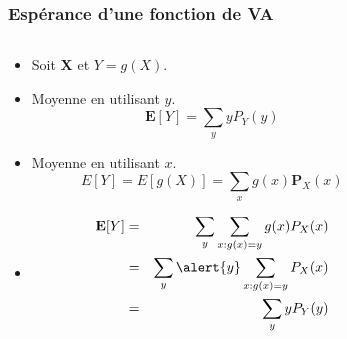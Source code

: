 \documentclass{beamer}
\begin{document}
\begin{frame}[t]
  \frametitle{Espérance d'une fonction de VA}

  \begin{columns}
    \begin{column}{0.5\textwidth}
      \begin{itemize}
        \scriptsize
        \item<1-> Soit \alert{\textbf{X}}  et \alert{$Y = g(X)$}.\\[12pt]
        \item<2->  Moyenne en utilisant $y$.
          $$
          \mathbf{E}[Y] = \sum_y y P_Y(y)
          $$
        \item<3-> Moyenne en utilisant $x$.
          \begin{equation*}
            E[Y] = E[g(X)] = \sum_x g(x) \mathbf{P}_X(x)
          \end{equation*}
        \item<4->
          \begin{eqnarray*}
            \mathbf{E}[Y] &=& \sum_y \sum_{x: g(x)=y}g(x)P_X(x) \\
                          &=& \sum_y \alert{y}\sum_{x: g(x)=y}P_X(x)\\
                          &=& \sum_y y P_Y(y)
          \end{eqnarray*}
      \end{itemize}
    \end{column}
    \begin{column}{0.5\textwidth}
       \centering
    \end{column}
  \end{columns}
\end{frame}
\end{document}
